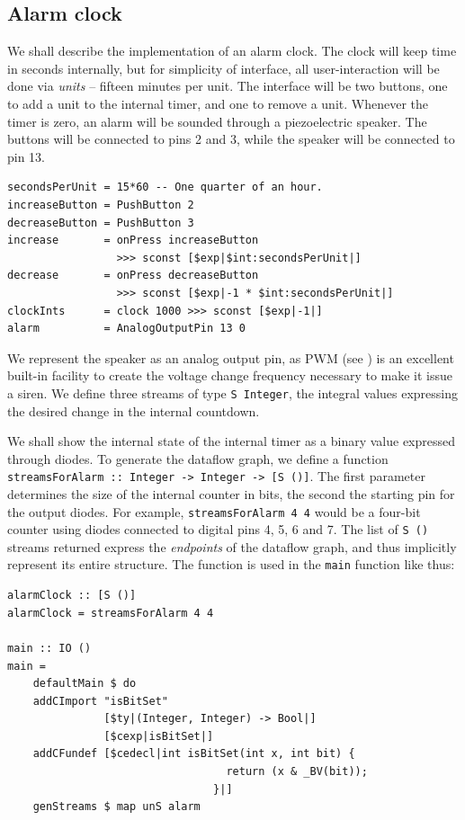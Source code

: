 \documentclass[a4paper, oneside, final]{memoir}
\let\Fref\undefined
\begin{document}
\subsection{Alarm clock}

We shall describe the implementation of an alarm clock.  The clock
will keep time in seconds internally, but for simplicity of interface,
all user-interaction will be done via \textit{units} -- fifteen
minutes per unit.  The interface will be two buttons, one to add a
unit to the internal timer, and one to remove a unit.  Whenever the
timer is zero, an alarm will be sounded through a piezoelectric
speaker.  The buttons will be connected to pins 2 and 3, while the
speaker will be connected to pin 13.


\begin{verbatim}
secondsPerUnit = 15*60 -- One quarter of an hour.
increaseButton = PushButton 2
decreaseButton = PushButton 3
increase       = onPress increaseButton 
                 >>> sconst [$exp|$int:secondsPerUnit|]
decrease       = onPress decreaseButton 
                 >>> sconst [$exp|-1 * $int:secondsPerUnit|]
clockInts      = clock 1000 >>> sconst [$exp|-1|]
alarm          = AnalogOutputPin 13 0
\end{verbatim}

We represent the speaker as an analog output pin, as PWM (see
\Fref{sec:pwm}) is an excellent built-in facility to create the
voltage change frequency necessary to make it issue a siren.  We
define three streams of type \texttt{S Integer}, the integral values
expressing the desired change in the internal countdown.

We shall show the internal state of the internal timer as a binary
value expressed through diodes.  To generate the dataflow graph, we
define a function \texttt{streamsForAlarm :: Integer -> Integer -> [S
  ()]}.  The first parameter determines the size of the internal
counter in bits, the second the starting pin for the output diodes.
For example, \texttt{streamsForAlarm 4 4} would be a four-bit counter
using diodes connected to digital pins 4, 5, 6 and 7.  The list of
\texttt{S ()} streams returned express the \textit{endpoints} of the
dataflow graph, and thus implicitly represent its entire structure.
The function is used in the \texttt{main} function like thus:

\begin{verbatim}
alarmClock :: [S ()]
alarmClock = streamsForAlarm 4 4

main :: IO ()
main =
    defaultMain $ do
    addCImport "isBitSet" 
               [$ty|(Integer, Integer) -> Bool|] 
               [$cexp|isBitSet|]
    addCFundef [$cedecl|int isBitSet(int x, int bit) {
                                  return (x & _BV(bit));
                                }|]
    genStreams $ map unS alarm
\end{verbatim}
\end{document}
